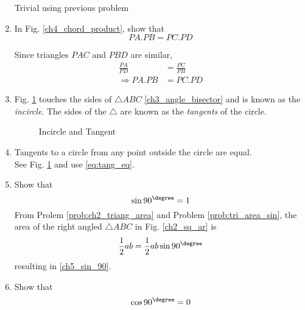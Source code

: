 \begin{enumerate}[label=\arabic*.,ref=\thesubsection.\theenumi]
\solution Trivial using previous problem
\item
	In Fig. \ref{ch4_chord_product}, show that 
	\begin{equation}
	PA.PB = PC.PD
	\end{equation}

%
\solution Since triangles $PAC$ and $PBD$ are similar, 
%
\begin{align}
\frac{PA}{PD} &= \frac{PC}{PB} \\
\Rightarrow PA.PB &= PC.PD
\end{align}
%
\item
	Fig. \ref{fig:incirc_def} touches the sides of $\triangle ABC$ \eqref{ch3_angle_bisector} and is known as  the {\em incircle}.  The sides of the $\triangle$	are known as the {\em tangents} of the circle.

\begin{figure}[!ht]
	\begin{center}
		
		\resizebox{\columnwidth}{!}{}
	\end{center}
	\caption{Incircle and Tangent}
	\label{fig:incirc_def}	
\end{figure}
%
\item Tangents to a circle from any point outside the circle are equal.
\\
\solution See Fig. \ref{fig:incirc_def} and use \eqref{eq:tang_eq}.

\item
	Show that 
	\begin{equation}
	\label{ch5_sin_90}
	\sin 90^{\degree} = 1
	\end{equation}
\solution From 	Prolem \ref{prob:ch2_triang_area}
and Problem \ref{prob:tri_area_sin}, the area of the right angled $\triangle ABC$ in Fig. \ref{ch2_sq_ar} is 	
	\begin{equation}
	\label{ch5_sin_90_der}
	\frac{1}{2}ab = \frac{1}{2}ab\sin 90^{\degree} 
	\end{equation}
%
resulting in 	\eqref{ch5_sin_90}.
\item
	Show that 
	\begin{equation}
	\label{ch5_cos_90}
	\cos 90^{\degree} = 0
	\end{equation}


\end{enumerate}
